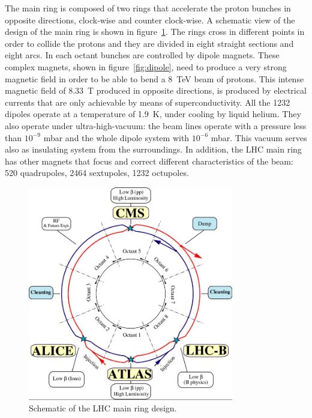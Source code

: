 The main ring is composed of two rings that accelerate the proton bunches in opposite directions, clock-wise and counter clock-wise. A schematic view of the design of the main ring is shown in figure~\ref{fig:schematic}. The rings cross in different points in order to collide the protons and they are divided in eight straight sections and eight arcs. In each octant bunches are controlled by dipole magnets. These complex magnets, shown in figure~\ref{fig:dipole}, need to produce a very strong magnetic field in order to be able to bend a 8~TeV beam of protons. This intense magnetic field of 8.33~T produced in opposite directions, is produced by electrical currents that are only achievable by means of superconductivity. All the 1232 dipoles operate at a temperature of 1.9~K, under cooling by liquid helium. They also operate under ultra-high-vacuum: the beam lines operate with a pressure less than $10^{-9}$ mbar and the whole dipole system with $10^{-6}$ mbar. This vacuum serves also as insulating system from the surroundings. In addition, the LHC main ring has other magnets that focus and correct different characteristics of the beam: 520 quadrupoles, 2464 sextupoles, 1232 octupoles. 

\begin{figure}[!Hhtbp]
  \begin{center}
    \includegraphics[width=0.8\textwidth]{figs/lhc-schematic.jpg}
    \caption{Schematic of the LHC main ring design.}
    \label{fig:schematic}
  \end{center}
\end{figure}

